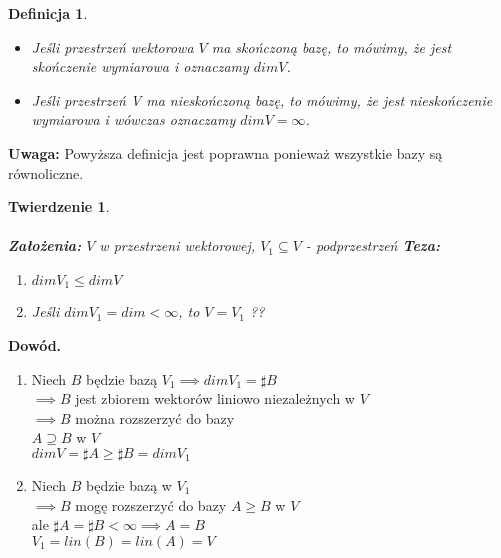 \documentclass[a5paper,8pt]{article}
\newtheorem{definition}{Definicja}[section]
\newtheorem{theorem}{Twierdzenie}[section]
\begin{document}
    \begin{definition} \hfill
        \begin{itemize}
            \item Jeśli przestrzeń wektorowa $ V $ ma skończoną bazę, to mówimy, że jest skończenie wymiarowa i oznaczamy $ dim V $.
            \item Jeśli przestrzeń V ma nieskończoną bazę, to mówimy, że jest nieskończenie wymiarowa i wówczas oznaczamy $ dim V = \infty $.
        \end{itemize}
    \end{definition}

    \large{\textbf{Uwaga:}}
    Powyższa definicja jest poprawna ponieważ wszystkie bazy są równoliczne.


    \begin{theorem} \hfill \\\\
        \textbf{Założenia: } $ V $ w przestrzeni wektorowej, $ V_1 \subseteq V $ - podprzestrzeń
        \textbf{Teza: }
        \begin{enumerate}
            \item $ dim V_1 \leq dim V $
            \item Jeśli $ dim V_1 = dim < \infty $, to $ V = V_1 $ ??
        \end{enumerate}
    \end{theorem}

    \large{\textbf{Dowód.}} \\
    \begin{enumerate}
        \item Niech $B$ będzie bazą $ V_1 \implies dim V_1 = \sharp B $ \\
              $ \implies B $ jest zbiorem wektorów liniowo niezależnych w $ V $ \\
              $ \implies B $ można rozszerzyć do bazy \\
              $ A \supseteq B $ w $ V $ \\
              $ dim V = \sharp A \geq \sharp B = dim V_1 $
        \item Niech $B$ będzie bazą w $V_1$ \\
              $ \implies B $ mogę rozszerzyć do bazy $ A \geq B $ w $V$ \\
              ale  $ \sharp A = \sharp B < \infty \implies A = B $ \\

              $ V_1 = lin( B ) = lin( A ) = V  $
    \end{enumerate}
\end{document}
